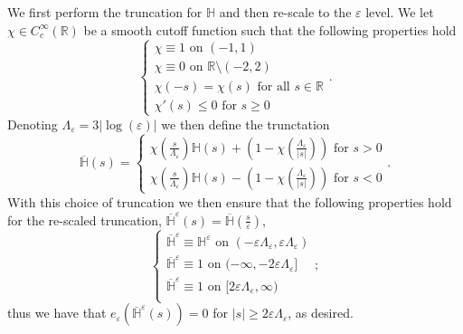 \documentclass[11pt]{article}
\begin{document}
\bigskip

We first perform the truncation for $\mathbb{H}$ and then re-scale to the $\varepsilon$ level. We let $\chi \in C^\infty_c(\mathbb{R})$ be a smooth cutoff function such that the following properties hold  
$$
\begin{cases}
    \chi \equiv 1 \text{ on } (-1,1)\\
    \chi \equiv 0 \text{ on } \mathbb{R} \setminus (-2,2)\\
    \chi(-s) = \chi(s) \text{ for all } s \in \mathbb{R}\\
    \chi'(s) \leq 0 \text{ for } s \geq 0
\end{cases}.$$
Denoting $\Lambda_\varepsilon = 3|\log (\varepsilon)|$ we then define the trunctation
$$\overline{\mathbb{H}}(s) = 
\begin{cases}
    \chi\left(\frac{s}{\Lambda_\varepsilon}\right)\mathbb{H}(s) + \left(1 - \chi\left(\frac{\Lambda_\varepsilon}{|s|}\right)\right) \text{ for } s > 0\\
     \chi\left(\frac{s}{\Lambda_\varepsilon}\right)\mathbb{H}(s) - \left(1 - \chi\left(\frac{\Lambda_\varepsilon}{|s|}\right)\right) \text{ for } s < 0
\end{cases}.$$
With this choice of truncation we then ensure that the following properties hold for the re-scaled truncation, $\overline{\mathbb{H}}^\varepsilon(s) = \overline{\mathbb{H}}(\frac{s}{\varepsilon})$,
$$
\begin{cases}
    \overline{\mathbb{H}}^\varepsilon \equiv \mathbb{H}^\varepsilon \text{ on } (-\varepsilon\Lambda_\varepsilon,\varepsilon\Lambda_\varepsilon)\\
    \overline{\mathbb{H}}^\varepsilon \equiv 1 \text{ on } (-\infty,-2\varepsilon\Lambda_\varepsilon]\\
    \overline{\mathbb{H}}^\varepsilon \equiv 1 \text{ on } [2\varepsilon\Lambda_\varepsilon, \infty)\\
\end{cases};$$
thus we have that $e_\varepsilon(\overline{\mathbb{H}}^\varepsilon(s)) = 0$ for $|s| \geq 2\varepsilon \Lambda_\varepsilon$, as desired. 

\bigskip
\end{document}
